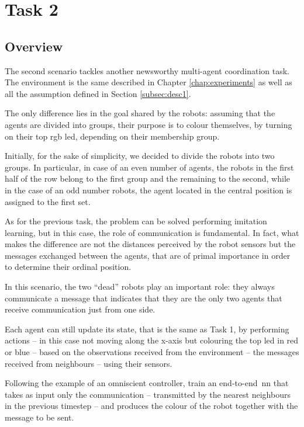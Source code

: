 \section{Task 2}
\label{sec:task2}

\subsection{Overview}
\label{subsec:desc2}

The second scenario tackles another newsworthy multi-agent coordination task. 
The environment is the same described in Chapter \ref{chap:experiments} as 
well as all the assumption defined in Section \ref{subsec:desc1}.

The only difference lies in the goal shared by the robots: assuming that the agents 
are divided into groups, their purpose is to colour themselves, by turning on their 
top \gls{rgb} \gls{led}, depending on their membership group.

Initially, for the sake of simplicity, we decided to divide the robots into two 
groups. In particular, in case of an even number of agents, the robots in the first 
half of the row belong to the first group and the remaining to the second, while in 
the case of an odd number robots, the agent located in the central position is 
assigned to the first set.

As for the previous task, the problem can be solved performing imitation 
learning, but in this case, the role of communication is fundamental. In fact, what 
makes the difference are not the distances perceived by the robot sensors but the 
messages exchanged between the agents, that are of primal importance in order 
to determine their ordinal position. 

In this scenario, the two ``dead'' robots play an important role: they always 
communicate a message that indicates that they are the only two agents that 
receive communication just from one side.

Each agent can still update its state, that is the same as Task 1, by performing 
actions – in this case not moving along the x-axis but colouring the top \gls{led} 
in red or blue – based on the observations received from the environment – the 
messages received from neighbours – using their sensors. 

Following the example of an omniscient controller, train an end-to-end \gls{nn} 
that takes as input only the communication – transmitted by the nearest 
neighbours in the previous timestep – and produces the colour of the robot 
together with the message to be sent.

